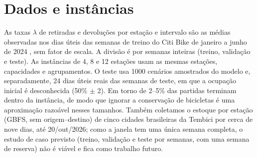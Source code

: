 \documentclass[12pt,a4paper]{article}
\begin{document}
\section{Dados e inst\^ancias}
As taxas $\lambda$ de retiradas e devolu\c{c}\~oes por esta\c{c}\~ao e intervalo s\~ao as m\'edias observadas nos dias \'uteis das semanas de treino do
Citi Bike de janeiro a junho de 2024 \citep{citibike}, sem fator de escala. A divis\~ao \'e por semanas inteiras (treino, valida\c{c}\~ao e teste). As
inst\^ancias de 4, 8 e 12 esta\c{c}\~oes usam as mesmas esta\c{c}\~oes, capacidades e agrupamentos. O teste usa 1000 cen\'arios amostrados do modelo
e, separadamente, 24 dias \'uteis reais das semanas de teste, em que a ocupa\c{c}\~ao inicial \'e desconhecida (50\% $\pm$ 2). Em torno de 2--5\% das
partidas terminam dentro da inst\^ancia, de modo que ignorar a conserva\c{c}\~ao de bicicletas \'e uma aproxima\c{c}\~ao razo\'avel nesses tamanhos.
Tamb\'em coletamos o estoque por esta\c{c}\~ao (GBFS, sem origem--destino) de cinco cidades brasileiras da Tembici por cerca de nove dias, at\'e 20/out/2026; como a janela tem uma \'unica semana completa, o estudo de caso previsto (treino, valida\c{c}\~ao e teste por semanas, com uma semana de reserva) n\~ao \'e vi\'avel e fica como trabalho futuro.
\end{document}
